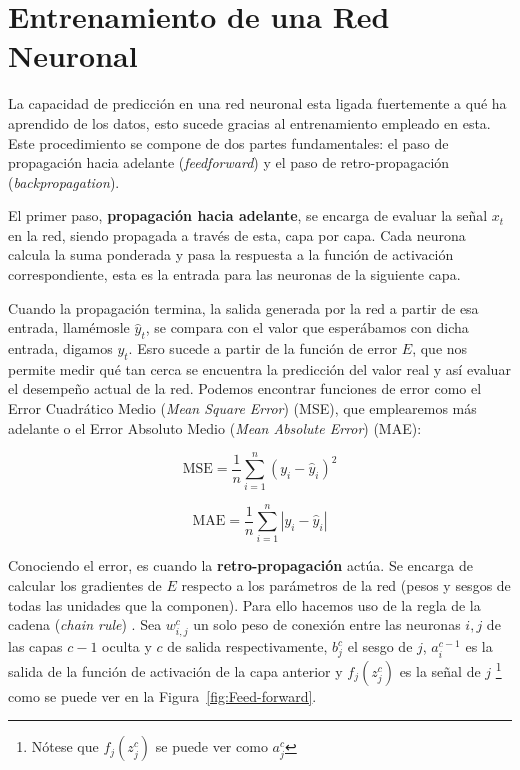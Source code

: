 \section{Entrenamiento de una Red Neuronal}

La capacidad de predicción en una red neuronal esta ligada fuertemente a qué ha aprendido de los datos, esto sucede gracias al entrenamiento empleado en esta. Este procedimiento se compone de dos partes fundamentales: el paso de propagación hacia adelante (\textit{feedforward}) y el paso de retro-propagación (\textit{backpropagation}).

El primer paso, \textbf{propagación hacia adelante}, se encarga de evaluar la señal $x_t$ en la red, siendo propagada a través de esta, capa por capa. Cada neurona calcula la suma ponderada y pasa la respuesta a la función de activación correspondiente, esta es la entrada para las neuronas de la siguiente capa. 

Cuando la propagación termina, la salida generada por la red a partir de esa entrada, llamémosle $\hat{y}_t$, se compara con el valor que esperábamos con dicha entrada, digamos $y_t$. Esro sucede a partir de la función de error $E$, que nos permite medir qué tan cerca se encuentra la predicción del valor real y así evaluar el desempeño actual de la red. Podemos encontrar funciones de error como el Error Cuadrático Medio (\textit{Mean Square Error}) (MSE), que emplearemos más adelante o el Error Absoluto Medio (\textit{Mean Absolute Error}) (MAE):

\[ \text{MSE} = \frac{1}{n} \sum_{i=1}^{n} (y_i - \hat{y}_i)^2
\]

\[\text{MAE} = \frac{1}{n} \sum_{i=1}^{n} |y_i - \hat{y}_i|\]


Conociendo el error, es cuando la \textbf{retro-propagación} actúa. Se encarga de calcular los gradientes de $E$ respecto a los parámetros de la red (pesos y sesgos de todas las unidades que la componen). Para ello hacemos uso de la regla de la cadena (\textit{chain rule}) \cite{understanding_backpropagation_Kostadinov}. Sea $w_{i,j}^{c}$ un solo peso de conexión entre las neuronas $i, j$ de las capas $c-1$ oculta y $c$ de salida respectivamente, $b_{j}^{c}$ el sesgo de $j$, $a_i^{c-1}$ es la salida de la función de activación de la capa anterior y $f_j(z^c_j)$ es la señal de $j$ \footnote{Nótese que $f_j(z^c_j)$ se puede ver como $a_j^{c}$} como se puede ver en la Figura~\ref{fig:Feed-forward}.

